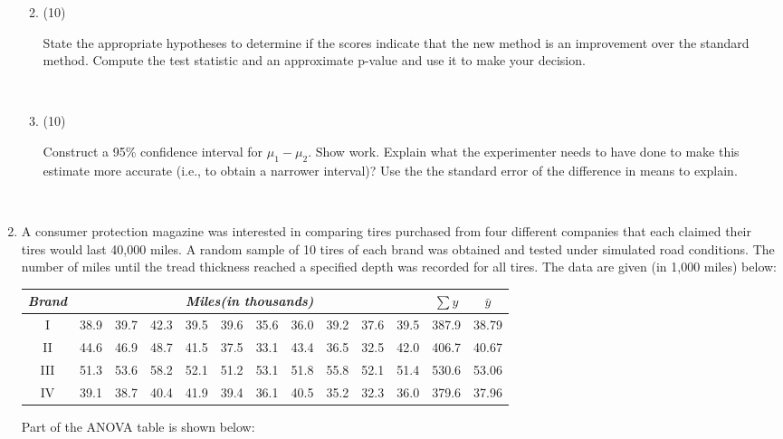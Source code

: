 \documentclass[12pt]{article}
\begin{document}
\begin{enumerate}
\begin{enumerate}
  
\newpage
\setlength{\headsep}{0.2in}

\item (10) \parbox[t]{6in}{State the appropriate
    hypotheses to determine if the scores indicate that the new
    method is an improvement over the standard method.  Compute the test statistic
    and  an approximate p-value and use it to make your decision.}\\[2.8in]
  \item (10) \parbox[t]{6in}{Construct a 95\% confidence interval
    for $\mu_1 - \mu_2$.  Show work. Explain what the experimenter
    needs to have done to make this estimate more accurate (i.e., to obtain a 
    narrower interval)? Use the the standard error of the difference in means
to explain.}\\[2.8in]

  
  \end{enumerate}
\newpage  
\setlength{\headsep}{0.2in}
 \item A consumer protection magazine was interested in comparing tires
purchased from four different companies that each claimed their tires
would last 40,000 miles. A random sample of 10 tires of each brand
was obtained and tested under simulated road conditions. The number
of miles until the tread thickness reached a specified depth was
recorded for all tires. The data are given (in 1,000 miles) below:
\begin{center}
\begin{tabular}{c|rrrrrrrrrr|rr}
\hline 
 \multicolumn{1}{c|}{\textit{Brand}} & \multicolumn{10}{c|}{\textit{Miles(in thousands)}} & 
     \multicolumn{1}{c}{$\sum{y}$} &
     \multicolumn{1}{c}{$\bar{y}$}  \\ \hline
I  &38.9 &39.7 &42.3 &39.5 &39.6 &35.6 &36.0 &39.2 &37.6 &39.5 & 387.9 & 38.79\\
II &44.6 &46.9 &48.7 &41.5 &37.5 &33.1 &43.4 &36.5 &32.5 &42.0 & 406.7 & 40.67 \\ 
III &51.3 &53.6 &58.2 &52.1 &51.2 &53.1 &51.8 &55.8 &52.1 &51.4 & 530.6 & 53.06 \\ 
IV &39.1 &38.7 &40.4 &41.9 &39.4 &36.1 &40.5 &35.2 &32.3 &36.0 & 379.6 & 37.96 \\ \hline
\end{tabular}
\end{center}


Part of the ANOVA table is shown below:


\end{enumerate}
\end{document}
